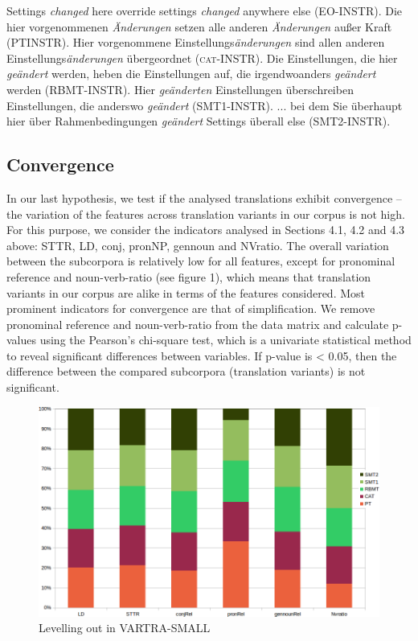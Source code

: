 \documentclass[output=paper]{LSP/langsci}
\begin{document}
{\ea \label{ex:4:6}
\ea Settings \textit{changed} here override settings \textit{changed} anywhere else (EO-INSTR).
\ex Die hier vorgenommenen \textit{Änderungen} setzen alle anderen \textit{Änderungen} außer Kraft (PTINSTR).
\ex Hier vorgenommene Einstellungs\textit{änderungen} sind allen anderen Einstellungs\textit{änderungen} übergeordnet (\textsc{cat}-INSTR).
\ex Die Einstellungen, die hier \textit{geändert} werden, heben die Einstellungen auf, die irgendwoanders \textit{geändert} werden (RBMT-INSTR).
\ex Hier \textit{geänderten} Einstellungen überschreiben Einstellungen, die anderswo \textit{geändert} (SMT1-INSTR).
\ex ... bei dem Sie überhaupt hier über Rahmenbedingungen \textit{geändert} Settings überall else (SMT2-INSTR).
\z
\z

\subsection{Convergence}

In our last hypothesis, we test if the analysed translations exhibit convergence – the variation of the features across translation variants in our corpus is not high. For this purpose, we consider the indicators analysed in Sections 4.1, 4.2 and 4.3 above: STTR, LD, conj, pronNP, gennoun and NVratio. The overall variation between the subcorpora is relatively low for all features, except for pronominal reference and noun-verb-ratio (see figure 1), which means that translation variants in our corpus are alike in terms of the features considered.  Most prominent indicators for convergence are that of simplification.  We remove pronominal reference and noun-verb-ratio from the data matrix and calculate p-values using the Pearson’s chi-square test, which is a univariate statistical method to reveal significant differences between variables. If p-value is < 0.05, then the difference between the compared subcorpora (translation variants) is not significant.

\begin{figure}
\includegraphics[width=1.0\textwidth]{./figures/5-1.png}
\caption{Levelling out in VARTRA-SMALL}
\end{figure} 

}
\end{document}
